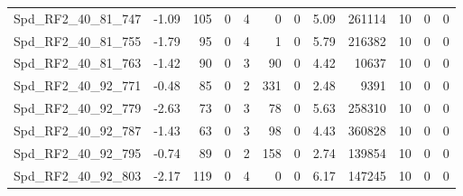 \begin{longtable}[c]{@{}lrrrrrrrrrrr@{}}
Spd\_RF2\_40\_81\_747        & -1.09                  & 105                     & 0                       & 4                      & 0                       & 0                       & 5.09                    & 261114                   & 10                       & 0                        & 0                        \\
Spd\_RF2\_40\_81\_755        & -1.79                  & 95                      & 0                       & 4                      & 1                       & 0                       & 5.79                    & 216382                   & 10                       & 0                        & 0                        \\
Spd\_RF2\_40\_81\_763        & -1.42                  & 90                      & 0                       & 3                      & 90                      & 0                       & 4.42                    & 10637                    & 10                       & 0                        & 0                        \\
Spd\_RF2\_40\_92\_771        & -0.48                  & 85                      & 0                       & 2                      & 331                     & 0                       & 2.48                    & 9391                     & 10                       & 0                        & 0                        \\
Spd\_RF2\_40\_92\_779        & -2.63                  & 73                      & 0                       & 3                      & 78                      & 0                       & 5.63                    & 258310                   & 10                       & 0                        & 0                        \\
Spd\_RF2\_40\_92\_787        & -1.43                  & 63                      & 0                       & 3                      & 98                      & 0                       & 4.43                    & 360828                   & 10                       & 0                        & 0                        \\
Spd\_RF2\_40\_92\_795        & -0.74                  & 89                      & 0                       & 2                      & 158                     & 0                       & 2.74                    & 139854                   & 10                       & 0                        & 0                        \\
Spd\_RF2\_40\_92\_803        & -2.17                  & 119                     & 0                       & 4                      & 0                       & 0                       & 6.17                    & 147245                   & 10                       & 0                        & 0                        \\

\end{longtable}

